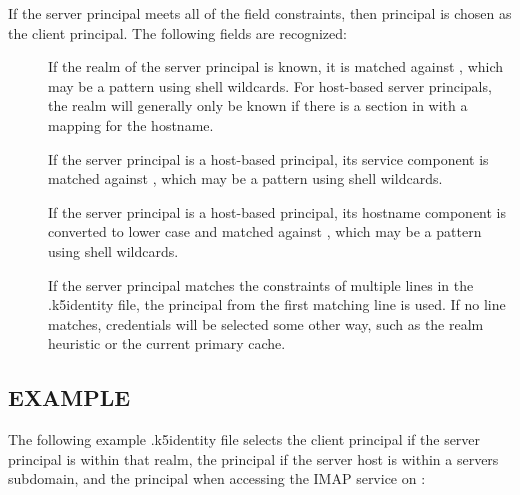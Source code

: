 \documentclass[letterpaper,10pt,english]{sphinxmanual}
\begin{document}
If the server principal meets all of the field constraints, then
principal is chosen as the client principal.  The following fields are
recognized:
\begin{description}
\item[{}] \leavevmode
If the realm of the server principal is known, it is matched
against , which may be a pattern using shell wildcards.
For host-based server principals, the realm will generally only be
known if there is a  section in
 with a mapping for the hostname.

\item[{}] \leavevmode
If the server principal is a host-based principal, its service
component is matched against , which may be a pattern using
shell wildcards.

\item[{}] \leavevmode
If the server principal is a host-based principal, its hostname
component is converted to lower case and matched against ,
which may be a pattern using shell wildcards.

If the server principal matches the constraints of multiple lines
in the .k5identity file, the principal from the first matching
line is used.  If no line matches, credentials will be selected
some other way, such as the realm heuristic or the current primary
cache.

\end{description}


\subsection{EXAMPLE}
\label{\detokenize{user/user_config/k5identity:example}}
The following example .k5identity file selects the client principal
 if the server principal is within that realm,
the principal  if the server host is within
a servers subdomain, and the principal  when
accessing the IMAP service on :

%
\begin{sphinxVerbatim}[commandchars=\\\{\}]
       
  
   
\end{sphinxVerbatim}
\end{document}

